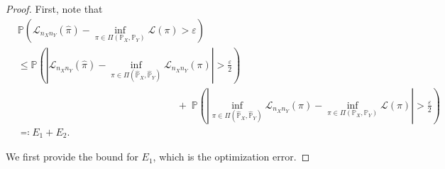 \documentclass{article}
\newtheorem{lemma}{Lemma}
\begin{document}
\begin{proof}
	First, note that
	\begin{align*}
		&\mathbb{P}\left(\mathcal{L}_{n_Xn_Y}(\hat{\pi}) - \inf_{\pi \in \Pi(\mathbb{P}_X,\mathbb{P}_Y)} \mathcal{L}(\pi) > \varepsilon\right) \\[2pt]
		&\leq \mathbb{P}\left(\left\vert \mathcal{L}_{n_Xn_Y}(\hat{\pi}) - \inf_{\pi \in \Pi(\hat{\mathbb{P}}_X,\hat{\mathbb{P}}_Y)} \mathcal{L}_{n_Xn_Y}(\pi) \right\vert > \frac{\varepsilon}{2}\right) \\[5pt]
		&\qquad\qquad\qquad\qquad\qquad\qquad\qquad\qquad +\; \mathbb{P}\left(\left\vert \inf_{\pi \in \Pi(\hat{\mathbb{P}}_X,\hat{\mathbb{P}}_Y)} \mathcal{L}_{n_Xn_Y}(\pi) - \inf_{\pi \in \Pi(\mathbb{P}_X,\mathbb{P}_Y)} \mathcal{L}(\pi) \right\vert > \frac{\varepsilon}{2}\right) \\
		&\eqqcolon E_1 + E_2 .
	\end{align*}
	
	We first provide the bound for $E_1$, which is the optimization error.
	

\end{proof}
\end{document}
